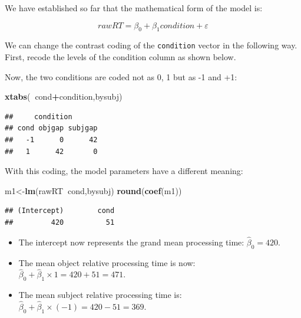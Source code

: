 \documentclass[12pt,]{krantz}
\newenvironment{Shaded}{\begin{snugshade}}{\end{snugshade}}
\newcommand{\CommentTok}[1]{\textcolor[rgb]{0.56,0.35,0.01}{\textit{#1}}}
\newcommand{\DecValTok}[1]{\textcolor[rgb]{0.00,0.00,0.81}{#1}}
\newcommand{\KeywordTok}[1]{\textcolor[rgb]{0.13,0.29,0.53}{\textbf{#1}}}
\newcommand{\NormalTok}[1]{#1}
\newcommand{\OperatorTok}[1]{\textcolor[rgb]{0.81,0.36,0.00}{\textbf{#1}}}
\newcommand{\StringTok}[1]{\textcolor[rgb]{0.31,0.60,0.02}{#1}}
\providecommand{\tightlist}{%
  \setlength{\itemsep}{0pt}\setlength{\parskip}{0pt}}
\begin{document}
We have established so far that the mathematical form of the model is:

\begin{equation}
rawRT = \beta_0 + \beta_1 condition + \varepsilon
\end{equation}

We can change the contrast coding of the \texttt{condition} vector in the following way. First, recode the levels of the condition column as shown below.

\begin{Shaded}
\end{Shaded}

Now, the two conditions are coded not as 0, 1 but as -1 and +1:

\begin{Shaded}
\begin{Highlighting}[]
\KeywordTok{xtabs}\NormalTok{(}\OperatorTok{~}\NormalTok{cond}\OperatorTok{+}\NormalTok{condition,bysubj)}
\end{Highlighting}
\end{Shaded}

\begin{verbatim}
##     condition
## cond objgap subjgap
##   -1      0      42
##   1      42       0
\end{verbatim}

With this coding, the model parameters have a different meaning:

\begin{Shaded}
\begin{Highlighting}[]
\NormalTok{m1<-}\KeywordTok{lm}\NormalTok{(rawRT}\OperatorTok{~}\NormalTok{cond,bysubj)}
\KeywordTok{round}\NormalTok{(}\KeywordTok{coef}\NormalTok{(m1))}
\end{Highlighting}
\end{Shaded}

\begin{verbatim}
## (Intercept)        cond 
##         420          51
\end{verbatim}

\begin{itemize}
\tightlist
\item
  The intercept now represents the grand mean processing time: \(\hat \beta_0=420\).
\item
  The mean object relative processing time is now: \(\hat\beta_0+\hat\beta_1\times 1=420+51=471\).
\item
  The mean subject relative processing time is: \(\hat\beta_0+\hat\beta_1\times (-1)=420-51=369\).
\end{itemize}
\end{document}
